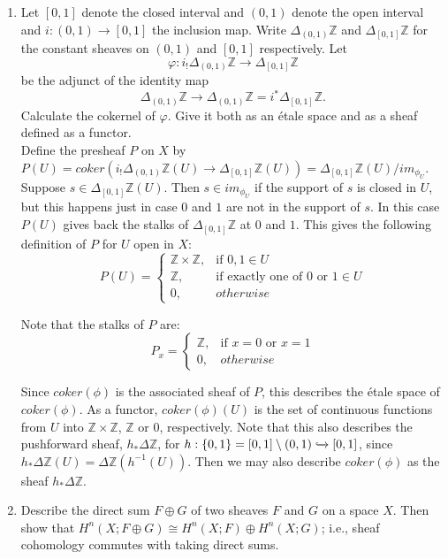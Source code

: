 \documentclass{article}
\newcommand{\zed}{\mathbb Z}
\begin{document}
\begin{enumerate}
\begin{enumerate}
\end{enumerate}
 \newpage
 \item 
Let $[0, 1]$ denote the closed interval and $(0, 1)$ denote the open
interval and $i: (0, 1) \to [0, 1]$ the inclusion map. Write $\Delta_{(0,1)}\zed$
and $\Delta_{[0,1]}\zed$ for the constant sheaves on $(0,1)$ and $[0,1]$ respectively. Let
$$\varphi: i_!\Delta_{(0,1)}\zed \to \Delta_{[0,1]}\zed$$
be the adjunct of the identity map
$$\Delta_{(0,1)}\zed \to \Delta_{(0,1)}\zed = i^*\Delta_{[0,1]}\zed.$$
Calculate the cokernel of $\varphi$. Give it both as an \'etale space and
as a sheaf defined as a functor.\\

Define the presheaf $P$ on $X$ by $P(U) = coker(i_!\Delta_{(0,1)}\mathbb{Z}(U) \rightarrow \Delta_{[0,1]}\mathbb{Z}(U)) = \Delta_{[0,1]}\mathbb{Z}(U) / im_{\phi_U}$. Suppose $s \in \Delta_{[0,1]}\mathbb{Z}(U)$. Then $s \in im_{\phi_U}$ if the support of $s$ is closed in $U$,  but this happens just in case $0$ and $1$ are not in the support of $s$. In this case $P(U)$ gives back the stalks of $\Delta_{[0,1]}\mathbb{Z}$ at $0$ and $1$. This gives the following definition of $P$ for $U$ open in $X$:
\[P(U) = \begin{cases}
\mathbb{Z} \times \mathbb{Z}, & \text{if } 0,1 \in U\\
\mathbb{Z}, & \text{if exactly one of } 0 \text{ or } 1 \in U\\
0, & otherwise 
\end{cases}
\]


Note that the stalks of $P$ are:
\[P_x = \begin{cases}
\mathbb{Z}, & \text{if } x=0 \text{ or } x=1\\
0, & otherwise 
\end{cases}
\]


Since $coker(\phi)$ is the associated sheaf of $P$, this describes the \'etale space of $coker(\phi)$. As a functor, $coker(\phi)(U)$ is the set of continuous functions from $U$ into $\mathbb{Z} \times \mathbb{Z}$, $\mathbb{Z}$ or $0$, respectively. Note that this also describes the pushforward sheaf, $h_*\Delta \mathbb{Z}$, for $h:\{0,1\} = [0,1] \setminus (0,1) \xhookrightarrow{} [0,1]$, since $h_*\Delta \mathbb{Z} (U) = \Delta \mathbb{Z} (h^{-1} (U))$. Then we may also describe $coker(\phi)$ as the sheaf $h_*\Delta \mathbb{Z}$. 


\newpage
\item
Describe the direct sum $F\oplus G$ of two sheaves $F$ and $G$ on a space $X$.
Then show that $H^n(X;F\oplus G)\cong H^n(X;F)\oplus H^n(X;G)$; i.e., sheaf cohomology commutes with taking direct sums.\\


\end{enumerate}
\end{document}
